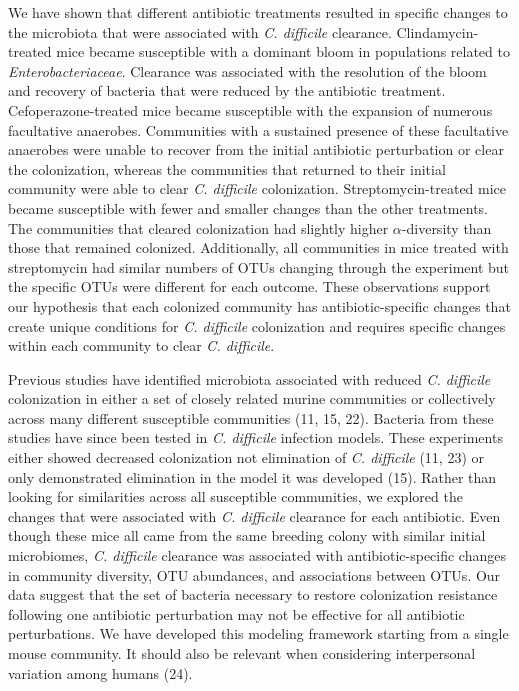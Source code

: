 \documentclass[12pt,]{article}
\begin{document}
We have shown that different antibiotic treatments resulted in specific
changes to the microbiota that were associated with \emph{C. difficile}
clearance. Clindamycin-treated mice became susceptible with a dominant
bloom in populations related to \emph{Enterobacteriaceae}. Clearance was
associated with the resolution of the bloom and recovery of bacteria
that were reduced by the antibiotic treatment. Cefoperazone-treated mice
became susceptible with the expansion of numerous facultative anaerobes.
Communities with a sustained presence of these facultative anaerobes
were unable to recover from the initial antibiotic perturbation or clear
the colonization, whereas the communities that returned to their initial
community were able to clear \emph{C. difficile} colonization.
Streptomycin-treated mice became susceptible with fewer and smaller
changes than the other treatments. The communities that cleared
colonization had slightly higher \(\alpha\)-diversity than those that
remained colonized. Additionally, all communities in mice treated with
streptomycin had similar numbers of OTUs changing through the experiment
but the specific OTUs were different for each outcome. These
observations support our hypothesis that each colonized community has
antibiotic-specific changes that create unique conditions for \emph{C.
difficile} colonization and requires specific changes within each
community to clear \emph{C. difficile}.

Previous studies have identified microbiota associated with reduced
\emph{C. difficile} colonization in either a set of closely related
murine communities or collectively across many different susceptible
communities (11, 15, 22). Bacteria from these studies have since been
tested in \emph{C. difficile} infection models. These experiments either
showed decreased colonization not elimination of \emph{C. difficile}
(11, 23) or only demonstrated elimination in the model it was developed
(15). Rather than looking for similarities across all susceptible
communities, we explored the changes that were associated with \emph{C.
difficile} clearance for each antibiotic. Even though these mice all
came from the same breeding colony with similar initial microbiomes,
\emph{C. difficile} clearance was associated with antibiotic-specific
changes in community diversity, OTU abundances, and associations between
OTUs. Our data suggest that the set of bacteria necessary to restore
colonization resistance following one antibiotic perturbation may not be
effective for all antibiotic perturbations. We have developed this
modeling framework starting from a single mouse community. It should
also be relevant when considering interpersonal variation among humans
(24).
\end{document}
